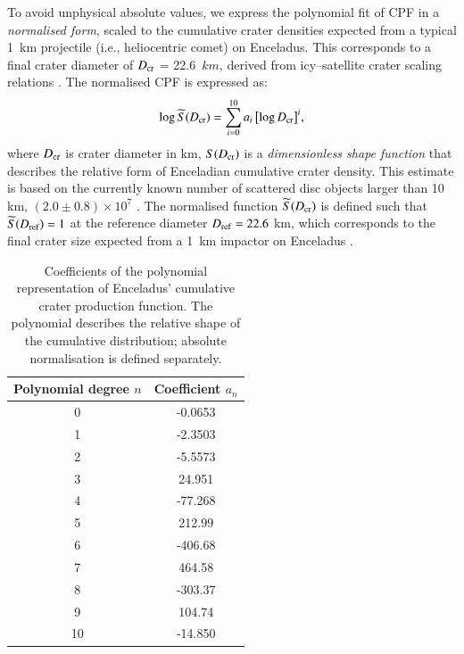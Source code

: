 \documentclass[preprint,11pt,3p,times,authoryear]{elsarticle}
\begin{document}
{To avoid unphysical absolute values, we express the polynomial fit of CPF in a \emph{normalised form}, scaled to the cumulative crater densities expected from a typical 1~km projectile (i.e., heliocentric comet) on Enceladus. This corresponds to a final crater diameter of $D_{\rm cr}$ = 22.6~$km$, derived from icy–satellite crater scaling relations \citep[e.g.,][]{Zahnle2003}. The normalised CPF is expressed as:
\begin{equation}
    \log \widetilde{S}(D_{\rm cr}) = \sum_{i=0}^{10} a_i \, \bigl[\log D_{\rm cr}\bigr]^i,
    \label{equ:cpf_scale}
\end{equation}
where $D_{\rm cr}$ is crater diameter in km, $S(D_{\rm cr})$ is a \emph{dimensionless shape function} that describes the relative form of Enceladian cumulative crater density.
This estimate is based on the currently known number of scattered disc objects larger than 10 km, $(2.0 \pm 0.8) \times 10^{7}$ \citep{Nesvorny2019}. The normalised function $\widetilde{S}(D_{\rm cr})$ is defined such that $\widetilde{S}(D_{\rm ref}) = 1$ at the reference diameter $D_{\rm ref} = 22.6$ km, which corresponds to the final crater size expected from a 1~km impactor on Enceladus \citep{Zahnle2003,Wong2023}. \\

\begin{table}[t]%
\centering
\begin{tabular}{cc}
\hline
\textbf{Polynomial degree $n$} & \textbf{Coefficient $a_n$} \\
\hline
0 & -0.0653  \\
1 & -2.3503 \\
2 & -5.5573 \\
3 & 24.951  \\
4 & -77.268 \\
5 & 212.99  \\
6 & -406.68 \\
7 & 464.58  \\
8 & -303.37 \\
9 & 104.74  \\
10 & -14.850 \\
\hline
\end{tabular}
\caption{Coefficients of the polynomial representation of Enceladus’ cumulative crater production function. The polynomial describes the relative shape of the cumulative distribution; absolute normalisation is defined separately.}
\label{tab:cpf}
\end{table}

}
\end{document}
